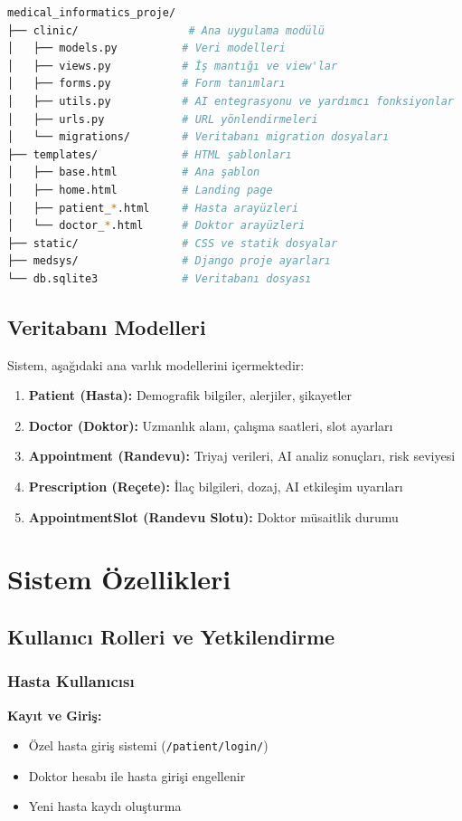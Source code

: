 \documentclass[12pt,a4paper]{article}
\begin{document}
\begin{lstlisting}[language=bash, caption=Proje dizin yapısı]
medical_informatics_proje/
├── clinic/                 # Ana uygulama modülü
│   ├── models.py          # Veri modelleri
│   ├── views.py           # İş mantığı ve view'lar
│   ├── forms.py           # Form tanımları
│   ├── utils.py           # AI entegrasyonu ve yardımcı fonksiyonlar
│   ├── urls.py            # URL yönlendirmeleri
│   └── migrations/        # Veritabanı migration dosyaları
├── templates/             # HTML şablonları
│   ├── base.html          # Ana şablon
│   ├── home.html          # Landing page
│   ├── patient_*.html     # Hasta arayüzleri
│   └── doctor_*.html      # Doktor arayüzleri
├── static/                # CSS ve statik dosyalar
├── medsys/                # Django proje ayarları
└── db.sqlite3             # Veritabanı dosyası
\end{lstlisting}

\subsection{Veritabanı Modelleri}
Sistem, aşağıdaki ana varlık modellerini içermektedir:

\begin{enumerate}
    \item \textbf{Patient (Hasta):} Demografik bilgiler, alerjiler, şikayetler
    \item \textbf{Doctor (Doktor):} Uzmanlık alanı, çalışma saatleri, slot ayarları
    \item \textbf{Appointment (Randevu):} Triyaj verileri, AI analiz sonuçları, risk seviyesi
    \item \textbf{Prescription (Reçete):} İlaç bilgileri, dozaj, AI etkileşim uyarıları
    \item \textbf{AppointmentSlot (Randevu Slotu):} Doktor müsaitlik durumu
\end{enumerate}

\section{Sistem Özellikleri}

\subsection{Kullanıcı Rolleri ve Yetkilendirme}

\subsubsection{Hasta Kullanıcısı}
\textbf{Kayıt ve Giriş:}
\begin{itemize}
    \item Özel hasta giriş sistemi (\texttt{/patient/login/})
    \item Doktor hesabı ile hasta girişi engellenir
    \item Yeni hasta kaydı oluşturma
\end{itemize}
\end{document}
